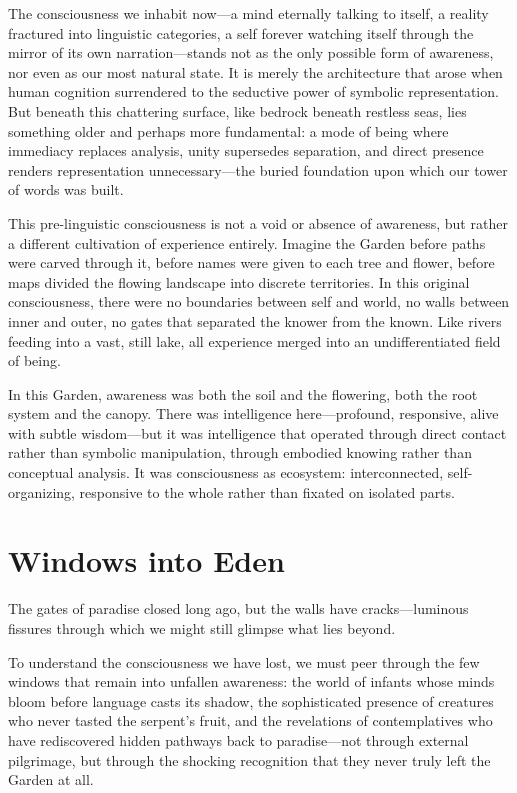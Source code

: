 The consciousness we inhabit now—a mind eternally talking to itself, a reality fractured into linguistic categories, a self forever watching itself through the mirror of its own narration—stands not as the only possible form of awareness, nor even as our most natural state. It is merely the architecture that arose when human cognition surrendered to the seductive power of symbolic representation. But beneath this chattering surface, like bedrock beneath restless seas, lies something older and perhaps more fundamental: a mode of being where immediacy replaces analysis, unity supersedes separation, and direct presence renders representation unnecessary—the buried foundation upon which our tower of words was built.

This pre-linguistic consciousness is not a void or absence of awareness, but rather a different cultivation of experience entirely. Imagine the Garden before paths were carved through it, before names were given to each tree and flower, before maps divided the flowing landscape into discrete territories. In this original consciousness, there were no boundaries between self and world, no walls between inner and outer, no gates that separated the knower from the known. Like rivers feeding into a vast, still lake, all experience merged into an undifferentiated field of being.

In this Garden, awareness was both the soil and the flowering, both the root system and the canopy. There was intelligence here—profound, responsive, alive with subtle wisdom—but it was intelligence that operated through direct contact rather than symbolic manipulation, through embodied knowing rather than conceptual analysis. It was consciousness as ecosystem: interconnected, self-organizing, responsive to the whole rather than fixated on isolated parts.

\section{Windows into Eden}

The gates of paradise closed long ago, but the walls have cracks—luminous fissures through which we might still glimpse what lies beyond.

To understand the consciousness we have lost, we must peer through the few windows that remain into unfallen awareness: the world of infants whose minds bloom before language casts its shadow, the sophisticated presence of creatures who never tasted the serpent's fruit, and the revelations of contemplatives who have rediscovered hidden pathways back to paradise—not through external pilgrimage, but through the shocking recognition that they never truly left the Garden at all.

